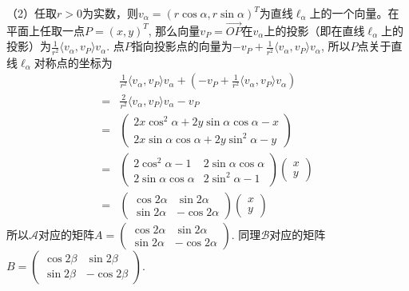 （2）任取$r > 0$为实数，则$v_{\alpha} = (r\cos\alpha, r\sin\alpha)^T$为直线$\ell_{\alpha}$上的一个向量。在平面上任取一点$P = (x,y)^T$, 那么向量$v_P = \overrightarrow{OP}$在$v_{\alpha}$上的投影（即在直线$\ell_{\alpha}$上的投影）为$\frac{1}{r^2} \langle v_{\alpha}, v_P \rangle v_{\alpha}$. 点$P$指向投影点的向量为$-v_P + \frac{1}{r^2} \langle v_{\alpha}, v_P \rangle v_{\alpha}$, 所以$P$点关于直线$\ell_{\alpha}$对称点的坐标为
\begin{align*}
& \frac{1}{r^2} \langle v_{\alpha}, v_P \rangle v_{\alpha} + (-v_P + \frac{1}{r^2} \langle v_{\alpha}, v_P \rangle v_{\alpha}) \\
= & \frac{2}{r^2}\langle v_{\alpha}, v_P \rangle v_{\alpha} - v_P \\
= & \begin{pmatrix} 2x\cos^2\alpha + 2y\sin\alpha\cos\alpha - x \\ 2x\sin\alpha\cos\alpha + 2y\sin^2\alpha - y \end{pmatrix} \\
= & \begin{pmatrix} 2\cos^2\alpha - 1 & 2\sin\alpha\cos\alpha \\ 2\sin\alpha\cos\alpha & 2\sin^2\alpha - 1 \end{pmatrix} \begin{pmatrix} x \\ y \end{pmatrix} \\
= & \begin{pmatrix} \cos 2\alpha & \sin 2\alpha \\ \sin 2\alpha & -\cos 2\alpha \end{pmatrix} \begin{pmatrix} x \\ y \end{pmatrix}
\end{align*}
所以$\mathscr{A}$对应的矩阵$A = \begin{pmatrix} \cos 2\alpha & \sin 2\alpha \\ \sin 2\alpha & -\cos 2\alpha \end{pmatrix}$. 同理$\mathscr{B}$对应的矩阵$B = \begin{pmatrix} \cos 2\beta & \sin 2\beta \\ \sin 2\beta & -\cos 2\beta \end{pmatrix}$.

